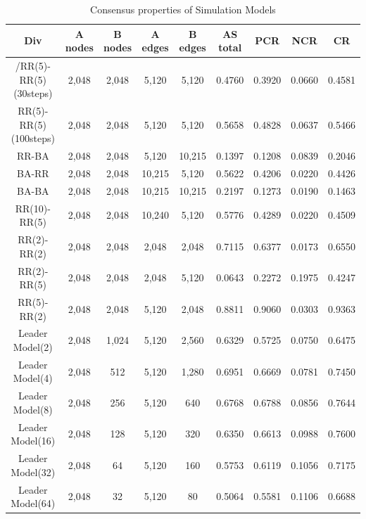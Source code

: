 \documentclass[english]{cccconf}
\begin{document}
\begin{table}[!htb]
	\centering
	\caption{Consensus properties of Simulation Models}
	\label{tab1}
	\begin{center}
		\begin{tabular}{c|c|c|c|c|c|c|c|c} \hline\hline
			Div                    & A nodes& B nodes & A edges & B edges & AS total  & PCR    & NCR    & CR       \\ \hline \hline
			/RR(5)-RR(5)(30steps)   & 2,048  & 2,048   & 5,120   & 5,120   & 0.4760    & 0.3920 & 0.0660 & 0.4581   \\ \hline
			RR(5)-RR(5)(100steps)  & 2,048  & 2,048   & 5,120   & 5,120   & 0.5658    & 0.4828 & 0.0637 & 0.5466   \\ \hline
			RR-BA             	   & 2,048 	& 2,048   & 5,120   & 10,215  & 0.1397    & 0.1208 & 0.0839 & 0.2046   \\ \hline 
			BA-RR             	   & 2,048 	& 2,048   & 10,215  & 5,120   & 0.5622    & 0.4206 & 0.0220 & 0.4426   \\ \hline
			BA-BA             	   & 2,048 	& 2,048   & 10,215  & 10,215  & 0.2197    & 0.1273 & 0.0190 & 0.1463   \\ \hline
			RR(10)-RR(5)      	   & 2,048 	& 2,048   & 10,240  & 5,120   & 0.5776    & 0.4289 & 0.0220 & 0.4509   \\ \hline
			RR(2)-RR(2)            & 2,048 	& 2,048   & 2,048   & 2,048   & 0.7115    & 0.6377 & 0.0173 & 0.6550   \\ \hline 
			RR(2)-RR(5)            & 2,048 	& 2,048   & 2,048   & 5,120   & 0.0643    & 0.2272 & 0.1975 & 0.4247   \\ \hline 
			RR(5)-RR(2)            & 2,048 	& 2,048   & 5,120   & 2,048   & 0.8811    & 0.9060 & 0.0303 & 0.9363   \\ \hline
			Leader Model(2)        & 2,048 	& 1,024   & 5,120   & 2,560   & 0.6329    & 0.5725 & 0.0750 & 0.6475   \\ \hline    
			Leader Model(4)        & 2,048 	&  512    & 5,120   & 1,280   & 0.6951    & 0.6669 & 0.0781 & 0.7450   \\ \hline
			Leader Model(8)        & 2,048 	&  256    & 5,120   & 640     & 0.6768    & 0.6788 & 0.0856 & 0.7644   \\ \hline
			Leader Model(16)       & 2,048 	&  128    & 5,120   & 320     & 0.6350    & 0.6613 & 0.0988 & 0.7600   \\ \hline
			Leader Model(32)       & 2,048 	&   64    & 5,120   & 160     & 0.5753    & 0.6119 & 0.1056 & 0.7175   \\ \hline
			Leader Model(64)       & 2,048 	&   32    & 5,120   & 80      & 0.5064    & 0.5581 & 0.1106 & 0.6688   \\ \hline  \hline
		\end{tabular}
	\end{center}
\end{table} 
\end{document}
